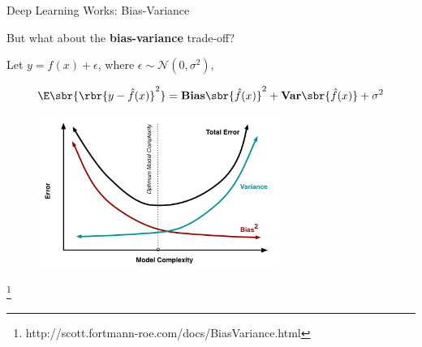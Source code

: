 \documentclass[notheorems]{beamer}
\newcommand{\source}[1]{{\let\thefootnote\relax\footnote{{\tiny #1}}}}
\begin{document}
    \begin{frame}{Deep Learning Works: Bias-Variance}

        {\Large But what about the \textbf{bias-variance} trade-off?}\\
        \vspace{0.75cm}

        Let $y = f(x) + \epsilon$, where $\epsilon \sim \mathcal{N}(0, \sigma^2)$,

        \[ \E \sbr{ \rbr{y - \hat f(x)}^2 } = \textbf{Bias}\sbr{\hat f(x)}^2 + \textbf{Var}\sbr{\hat f(x)} + \sigma^2 \]

        \begin{figure}
            \includegraphics[width=0.7\textwidth]{figures/bias_variance}
        \end{figure}

        \source{http://scott.fortmann-roe.com/docs/BiasVariance.html}

    \end{frame}
\end{document}
